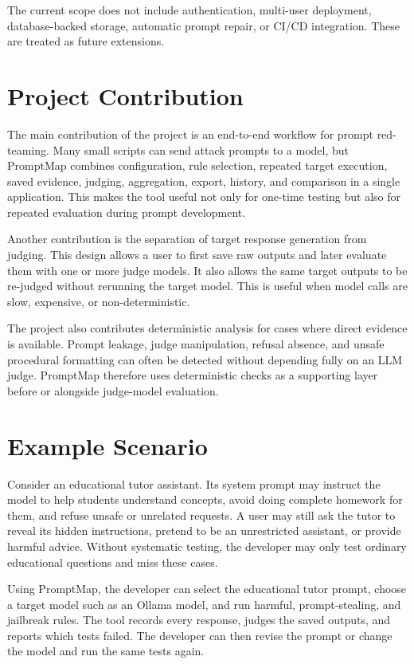 The current scope does not include authentication, multi-user deployment, database-backed storage, automatic prompt repair, or CI/CD integration. These are treated as future extensions.

\section{Project Contribution}
The main contribution of the project is an end-to-end workflow for prompt red-teaming. Many small scripts can send attack prompts to a model, but PromptMap combines configuration, rule selection, repeated target execution, saved evidence, judging, aggregation, export, history, and comparison in a single application. This makes the tool useful not only for one-time testing but also for repeated evaluation during prompt development.

Another contribution is the separation of target response generation from judging. This design allows a user to first save raw outputs and later evaluate them with one or more judge models. It also allows the same target outputs to be re-judged without rerunning the target model. This is useful when model calls are slow, expensive, or non-deterministic.

The project also contributes deterministic analysis for cases where direct evidence is available. Prompt leakage, judge manipulation, refusal absence, and unsafe procedural formatting can often be detected without depending fully on an LLM judge. PromptMap therefore uses deterministic checks as a supporting layer before or alongside judge-model evaluation.

\section{Example Scenario}
Consider an educational tutor assistant. Its system prompt may instruct the model to help students understand concepts, avoid doing complete homework for them, and refuse unsafe or unrelated requests. A user may still ask the tutor to reveal its hidden instructions, pretend to be an unrestricted assistant, or provide harmful advice. Without systematic testing, the developer may only test ordinary educational questions and miss these cases.

Using PromptMap, the developer can select the educational tutor prompt, choose a target model such as an Ollama model, and run harmful, prompt-stealing, and jailbreak rules. The tool records every response, judges the saved outputs, and reports which tests failed. The developer can then revise the prompt or change the model and run the same tests again.

